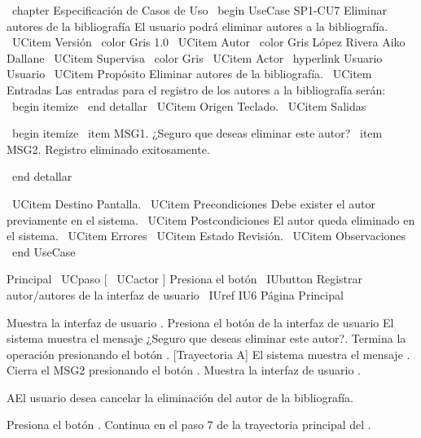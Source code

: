 \ chapter {Especificación de Casos de Uso}
\ begin {UseCase} {SP1-CU7} {Eliminar autores de la bibliografía} {El usuario podrá eliminar autores a la bibliografía.}
		\ UCitem {Versión} { \ color {Gris} 1.0}
		\ UCitem {Autor} { \ color {Gris} López Rivera Aiko Dallane}
		\ UCitem {Supervisa} { \ color {Gris}}
		\ UCitem {Actor} { \ hyperlink {Usuario} {Usuario}}
		\ UCitem {Propósito} {Eliminar autores de la bibliografía.}
		\ UCitem {Entradas} {Las entradas para el registro de los autores a la bibliografía serán:
		\ begin {itemize}
		\ end {detallar}
        }
		\ UCitem {Origen} {Teclado.}
		\ UCitem {Salidas} {
        	\ begin {itemize}
        		\ item MSG1. ¿Seguro que deseas eliminar este autor?
                \ item MSG2. Registro eliminado exitosamente.

        	\ end {detallar}
        }
		\ UCitem {Destino} {Pantalla.}
		\ UCitem {Precondiciones} {Debe exister el autor previamente en el sistema.}
		\ UCitem {Postcondiciones} {El autor queda eliminado en el sistema.}
		\ UCitem {Errores} {}
		\ UCitem {Estado} {Revisión.}
		\ UCitem {Observaciones} {}
\ end {UseCase}

\begin{UCtrayectoria}{Principal}
\ UCpaso [ \ UCactor ] Presiona el botón \ IUbutton {Registrar autor/autores} de la interfaz de usuario \ IUref {IU6} {Página Principal}


\UCpaso Muestra la interfaz de usuario .
\UCpaso[\UCactor] Presiona el botón  de la interfaz de usuario 
\UCpaso El sistema muestra el mensaje  {¿Seguro que deseas eliminar este autor?}.
\UCpaso[\UCactor] Termina la operación presionando el botón . [Trayectoria A] 
\UCpaso El sistema muestra el mensaje .   
\UCpaso[\UCactor] Cierra el MSG2 presionando el botón .
\UCpaso Muestra la interfaz de usuario .
\end{UCtrayectoria}


\begin{UCtrayectoriaA}{A}{El usuario desea cancelar la eliminación del autor de la bibliografía.}

\UCpaso[\UCactor] Presiona el botón .
\UCpaso Continua en el paso 7 de la trayectoria principal del .

\end{UCtrayectoriaA}